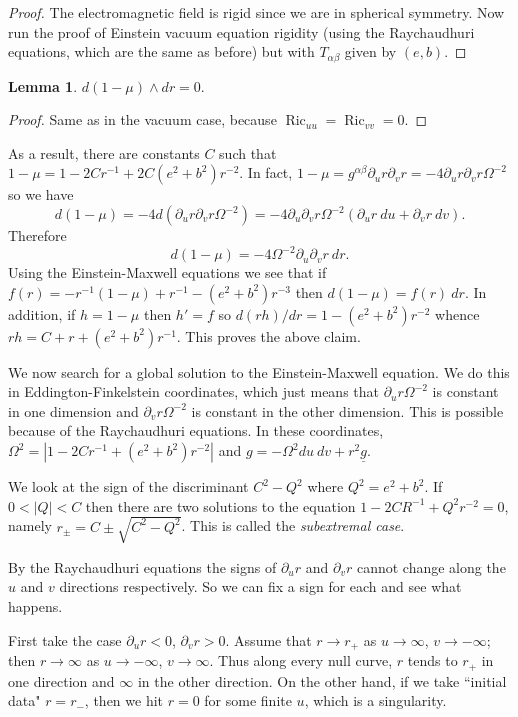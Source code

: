 \documentclass[12pt]{report}
\newcommand{\Ric}{\operatorname{Ric}}
\newcommand{\dfn}[1]{\emph{#1}\index{#1}}
\theoremstyle{definition}
\newtheorem{lemma}[theorem]{Lemma}
\begin{document}
\begin{proof}
    The electromagnetic field is rigid since we are in spherical symmetry. Now run the proof of Einstein vacuum equation rigidity (using the Raychaudhuri equations, which are the same as before) but with $T_{\alpha\beta}$ given by $(e, b)$.
\end{proof}
\begin{lemma}
    $d(1 - \mu) \wedge dr = 0$.
\end{lemma}
\begin{proof}
    Same as in the vacuum case, because $\Ric_{uu} = \Ric_{vv} = 0$.
\end{proof}
As a result, there are constants $C$ such that $1 - \mu = 1 - 2Cr^{-1} + 2C(e^2 + b^2)r^{-2}$. In fact, $1 - \mu = g^{\alpha\beta} \partial_u r \partial_v r = -4\partial_u r \partial_vr \Omega^{-2}$ so we have
$$d(1 - \mu) = -4d(\partial_u r \partial_v r\Omega^{-2}) = -4 \partial_u\partial_vr \Omega^{-2} (\partial_ur ~du + \partial_vr ~dv).$$
Therefore
$$d(1 - \mu) = -4\Omega^{-2}\partial_u\partial_vr ~dr.$$
Using the Einstein-Maxwell equations we see that if $f(r) = -r^{-1}(1 - \mu) + r^{-1} - (e^2 + b^2)r^{-3}$ then $d(1 - \mu) = f(r) ~dr$. In addition, if $h = 1 - \mu$ then $h' = f$ so $d(rh)/dr = 1 - (e^2 + b^2)r^{-2}$ whence $rh = C + r + (e^2 + b^2)r^{-1}$. This proves the above claim.

We now search for a global solution to the Einstein-Maxwell equation. We do this in Eddington-Finkelstein coordinates, which just means that $\partial_ur \Omega^{-2}$ is constant in one dimension and $\partial_vr \Omega^{-2}$ is constant in the other dimension. This is possible because of the Raychaudhuri equations. In these coordinates, $\Omega^2 = |1 - 2Cr^{-1} + (e^2 + b^2)r^{-2}|$ and $g = -\Omega^2 du~dv + r^2 \underline g$.

We look at the sign of the discriminant $C^2 - Q^2$ where $Q^2 = e^2 + b^2$. If $0 < |Q| < C$ then there are two solutions to the equation $1 - 2CR^{-1} + Q^2r^{-2} = 0$, namely $r_\pm = C \pm \sqrt{C^2 - Q^2}$. This is called the \dfn{subextremal case}.

By the Raychaudhuri equations the signs of $\partial_ur$ and $\partial_vr$ cannot change along the $u$ and $v$ directions respectively. So we can fix a sign for each and see what happens.

First take the case $\partial_ur < 0$, $\partial_vr > 0$. Assume that $r \to r_+$ as $u \to \infty$, $v \to -\infty$; then $r \to \infty$ as $u \to -\infty$, $v \to \infty$. Thus along every null curve, $r$ tends to $r_+$ in one direction and $\infty$ in the other direction. On the other hand, if we take ``initial data" $r = r_-$, then we hit $r = 0$ for some finite $u$, which is a singularity.
\end{document}
